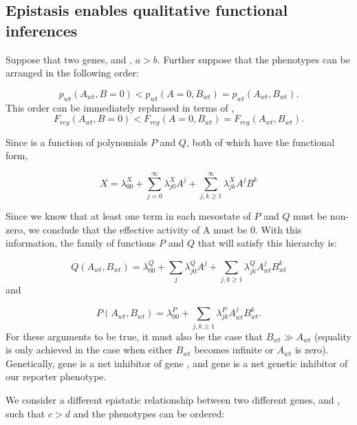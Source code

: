 \subsection{Epistasis enables qualitative functional inferences}

Suppose that two genes,  and , \(a > b\). Further suppose that
the phenotypes can be arranged in the following order:

\begin{equation*}
    p_{wt}(A_{wt}, B=0) < p_{wt}(A=0, B_{wt}) = p_{wt}(A_{wt}, B_{wt}).
\end{equation*}
This order can be immediately rephrased in terms of \Freg{},
\begin{equation*}
    F_{reg}(A_{wt}, B=0) < F_{reg}(A=0, B_{wt}) = F_{reg}(A_{wt}, B_{wt}).
\end{equation*}

Since \Freg{} is a function of polynomials \(P\) and \(Q\), both of which have
the functional form,

\begin{equation*}
    X = \lambda^X_{00} + \sum_{j=0}^\infty \lambda^X_{j0}A^j +
          \sum_{j,k \geq 1}^\infty \lambda^X_{jk}A^j B^k
\end{equation*}

Since we know that at least one term in each mesostate of \(P\) and \(Q\) must
be non-zero, we conclude that the effective activity of A must be 0. With this
information, the family of functions \(P\) and \(Q\) that will satisfy this
hierarchy is:

\begin{equation}
  Q(A_{wt}, B_{wt}) = \lambda^Q_{00} + \sum_j \lambda^Q_{j0}A^j +
                        \sum_{j,k\geq 1} \lambda^Q_{jk}A_{wt}^j B_{wt}^k
\end{equation}
and

\begin{equation}
  P(A_{wt}, B_{wt}) = \lambda^P_{00} +
                        \sum_{j,k \geq 1} \lambda^P_{jk}A_{wt}^j B_{wt}^k.
\end{equation}
For these arguments to be true, it must also be the case that
\(B_{wt} \gg A_{wt}\) (equality is only achieved in the case when either
\(B_{wt}\) becomes infinite or \(A_{wt}\) is zero). Genetically, gene 
is a net inhibitor of gene , and gene  is a net genetic
inhibitor of our reporter phenotype.

We consider a different epistatic relationship between two different genes,
 and , such that \(c > d\) and the phenotypes can be ordered:

